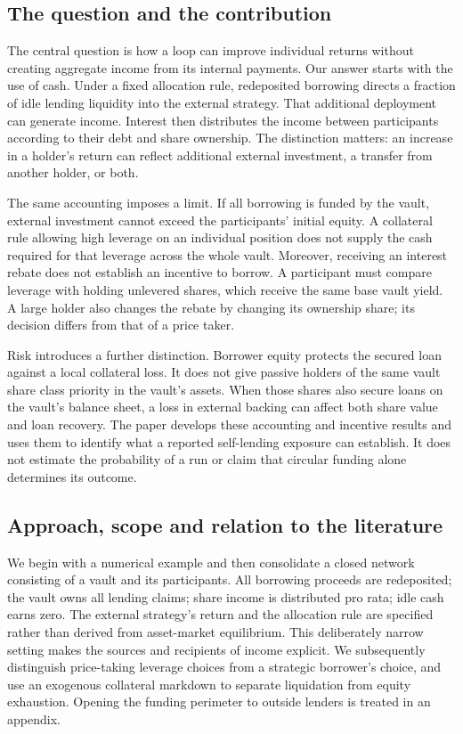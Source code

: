 \documentclass[12pt,oneside]{article}
\begin{document}
\subsection{The question and the contribution}
The central question is how a loop can improve individual returns
without creating aggregate income from its internal payments. Our
answer starts with the use of cash. Under a fixed allocation rule,
redeposited borrowing directs a fraction of idle lending liquidity
into the external strategy. That additional deployment can generate
income. Interest then distributes the income between participants
according to their debt and share ownership. The distinction matters:
an increase in a holder's return can reflect additional external
investment, a transfer from another holder, or both.

The same accounting imposes a limit. If all borrowing is funded by
the vault, external investment cannot exceed the participants' initial
equity. A collateral rule allowing high leverage on an individual
position does not supply the cash required for that leverage across
the whole vault. Moreover, receiving an interest rebate does not
establish an incentive to borrow. A participant must compare leverage
with holding unlevered shares, which receive the same base vault yield.
A large holder also changes the rebate by changing its ownership share;
its decision differs from that of a price taker.

Risk introduces a further distinction. Borrower equity protects the
secured loan against a local collateral loss. It does not give passive
holders of the same vault share class priority in the vault's assets.
When those shares also secure loans on the vault's balance sheet, a
loss in external backing can affect both share value and loan recovery.
The paper develops these accounting and incentive results and uses
them to identify what a reported self-lending exposure can establish.
It does not estimate the probability of a run or claim that circular
funding alone determines its outcome.

\subsection{Approach, scope and relation to the literature}
We begin with a numerical example and then consolidate a closed
network consisting of a vault and its participants. All borrowing
proceeds are redeposited; the vault owns all lending claims; share
income is distributed pro rata; idle cash earns zero. The external
strategy's return and the allocation rule are specified rather than
derived from asset-market equilibrium. This deliberately narrow
setting makes the sources and recipients of income explicit.
We subsequently distinguish price-taking leverage choices from a
strategic borrower's choice, and use an exogenous collateral markdown
to separate liquidation from equity exhaustion. Opening the funding
perimeter to outside lenders is treated in an appendix.
\end{document}
